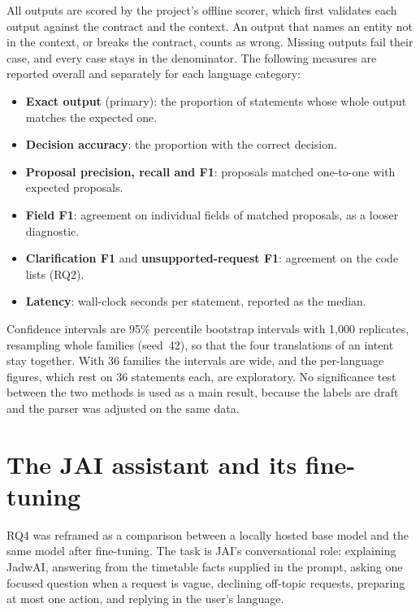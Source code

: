 All outputs are scored by the project's offline scorer, which first validates each output against the contract and the context. An output that names an entity not in the context, or breaks the contract, counts as wrong. Missing outputs fail their case, and every case stays in the denominator. The following measures are reported overall and separately for each language category:

\begin{itemize}
\item \textbf{Exact output} (primary): the proportion of statements whose whole output matches the expected one.
\item \textbf{Decision accuracy}: the proportion with the correct decision.
\item \textbf{Proposal precision, recall and F1}: proposals matched one-to-one with expected proposals.
\item \textbf{Field F1}: agreement on individual fields of matched proposals, as a looser diagnostic.
\item \textbf{Clarification F1} and \textbf{unsupported-request F1}: agreement on the code lists (RQ2).
\item \textbf{Latency}: wall-clock seconds per statement, reported as the median.
\end{itemize}

Confidence intervals are 95\% percentile bootstrap intervals with 1{,}000 replicates, resampling whole families (seed~42), so that the four translations of an intent stay together. With 36 families the intervals are wide, and the per-language figures, which rest on 36 statements each, are exploratory. No significance test between the two methods is used as a main result, because the labels are draft and the parser was adjusted on the same data.

\section{The JAI assistant and its fine-tuning}\label{meth-jai}

RQ4 was reframed as a comparison between a locally hosted base model and the same model after fine-tuning. The task is JAI's conversational role: explaining JadwAI, answering from the timetable facts supplied in the prompt, asking one focused question when a request is vague, declining off-topic requests, preparing at most one action, and replying in the user's language.

